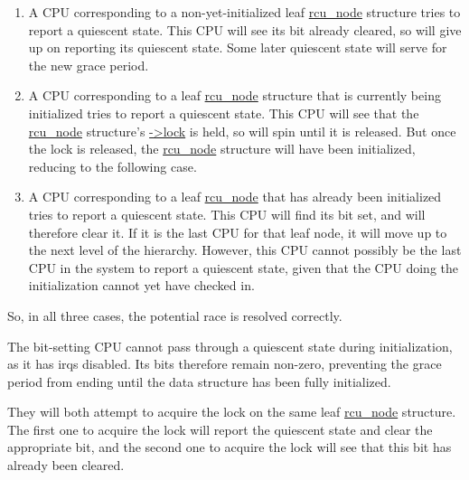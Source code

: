 \begin{enumerate}
\item	A CPU corresponding to a non-yet-initialized leaf \url{rcu_node}
	structure tries to report a quiescent state.
	This CPU will see its bit already cleared, so will give up on
	reporting its quiescent state.
	Some later quiescent state will serve for the new grace period.
\item	A CPU corresponding to a leaf \url{rcu_node} structure that
	is currently being initialized tries to report a quiescent state.
	This CPU will see that the \url{rcu_node} structure's
	\url{->lock} is held, so will spin until it is
	released.
	But once the lock is released, the \url{rcu_node}
	structure will have been initialized, reducing to the
	following case.
\item	A CPU corresponding to a leaf \url{rcu_node} that has
	already been initialized tries to report a quiescent state.
	This CPU will find its bit set, and will therefore clear it.
	If it is the last CPU for that leaf node, it will
	move up to the next level of the hierarchy.
	However, this CPU cannot possibly be the last CPU in the system to
	report a quiescent state, given that the CPU doing the initialization
	cannot yet have checked in.
\end{enumerate}

So, in all three cases, the potential race is resolved correctly.


The bit-setting CPU cannot pass through a
quiescent state during initialization, as it has irqs disabled.
Its bits therefore remain non-zero, preventing the grace period from
ending until the data structure has been fully initialized.


They will both attempt to acquire the lock on the same leaf
\url{rcu_node} structure.
The first one to acquire the lock will report the quiescent state
and clear the appropriate bit, and the second one to acquire the
lock will see that this bit has already been cleared.

